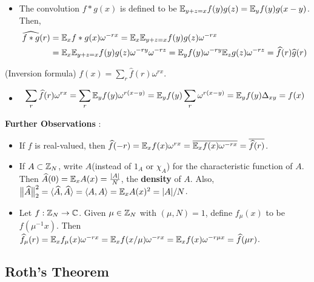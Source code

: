 \documentclass[12pt,a4paper]{report}
\renewcommand{\hat}{\widehat}
\begin{document}
\begin{itemize}
\item[ ]\pf The convolution $f*g(x)$ is defined to be $\mathbb{E}_{y+z =x} f(y) g(z) = \mathbb{E}_y f(y)g(x-y)$. Then,
\begin{align*}
\hat{f * g}(r) &= \avg_x f*g(x) \omega^{-rx} = \avg_x \avg_{y+z =x} f(y) g(z) \omega^{-rx} \\
&= \avg_x \avg_{y+z=x} f(y) g(z) \omega^{-ry}\omega^{-rz} = \avg_y f(y) \omega^{-ry} \avg_{z} g(z) \omega^{-rz} = \hat{f}(r) \hat{g}(r)
\end{align*}
\eop
\end{itemize} 
\s

(Inversion formula)  $f(x) = \sum_{r} \hat{f}(r)\omega^{rx}$.
\begin{itemize}
\item[ ] \pf
\begin{align*}
\sum_{r} \hat{f}(r) \omega^{rx} = \sum_r \avg_y f(y) \omega^{r(x-y)} = \avg_y f(y) \sum_r \omega^{r(x-y)} = \avg_y f(y) \Delta_{xy}  = f(x)
\end{align*}
\eop

\end{itemize}
\s

\textbf{Further Observations} :

\begin{itemize}
\item If $f$ is real-valued, then $\hat{f}(-r) = \avg_x f(x) \omega^{rx} = \bar{\avg_x f(x) \omega^{-rx}} = \overline{ \hat{f}(r) }$.

\item If $A\subset \mathbb{Z}_N$, write $A$(instead of $1_A$ or $\chi_A$) for the characteristic function of $A$. Then $\hat{A}(0) = \avg_x A(x) = \frac{|A|}{N}$, the \textbf{density} of $A$. Also, $\norms{\hat{A}}{2}^2 = \langle \hat{A}, \hat{A} \rangle = \langle A,A \rangle = \avg_x A(x)^2 = |A|/N$.

\item Let $f: \mathbb{Z}_N \rightarrow \mathbb{C}$. Given $\mu \in \mathbb{Z}_N$ with $(\mu, N)=1$, define $f_{\mu}(x)$ to be $f(\mu^{-1}x)$. Then $\hat{f}_{\mu}(r) = \avg_x f_{\mu}(x)\omega^{-rx} = \avg_x f(x/\mu) \omega^{-rx} = \avg_x f(x)\omega^{-r\mu x} = \hat{f}(\mu r)$.
\end{itemize}

\subsection*{Roth's Theorem}
\s
\end{document}
